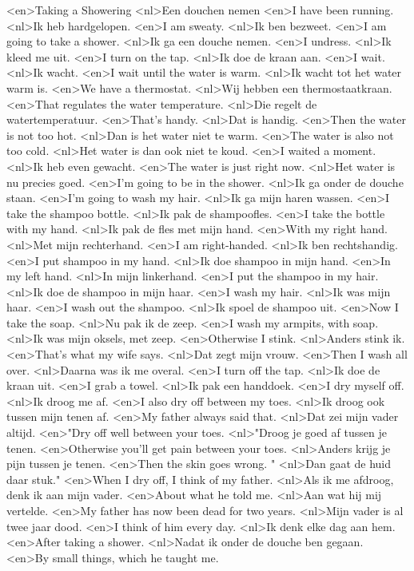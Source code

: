 <en>Taking a Showering
<nl>Een douchen nemen
<en>I have been running.
<nl>Ik heb hardgelopen.
<en>I am sweaty.
<nl>Ik ben bezweet.
<en>I am going to take a shower.
<nl>Ik ga een douche nemen.
<en>I undress.
<nl>Ik kleed me uit.
<en>I turn on the tap.
<nl>Ik doe de kraan aan.
<en>I wait.
<nl>Ik wacht.
<en>I wait until the water is warm.
<nl>Ik wacht tot het water warm is.
<en>We have a thermostat.
<nl>Wij hebben een thermostaatkraan.
<en>That regulates the water temperature.
<nl>Die regelt de watertemperatuur.
<en>That's handy.
<nl>Dat is handig.
<en>Then the water is not too hot.
<nl>Dan is het water niet te warm.
<en>The water is also not too cold.
<nl>Het water is dan ook niet te koud.
<en>I waited a moment.
<nl>Ik heb even gewacht.
<en>The water is just right now.
<nl>Het water is nu precies goed.
<en>I'm going to be in the shower.
<nl>Ik ga onder de douche staan.
<en>I'm going to wash my hair.
<nl>Ik ga mijn haren wassen.
<en>I take the shampoo bottle.
<nl>Ik pak de shampoofles.
<en>I take the bottle with my hand.
<nl>Ik pak de fles met mijn hand.
<en>With my right hand.
<nl>Met mijn rechterhand.
<en>I am right-handed.
<nl>Ik ben rechtshandig.
<en>I put shampoo in my hand.
<nl>Ik doe shampoo in mijn hand.
<en>In my left hand.
<nl>In mijn linkerhand.
<en>I put the shampoo in my hair.
<nl>Ik doe de shampoo in mijn haar.
<en>I wash my hair.
<nl>Ik was mijn haar.
<en>I wash out the shampoo.
<nl>Ik spoel de shampoo uit.
<en>Now I take the soap.
<nl>Nu pak ik de zeep.
<en>I wash my armpits, with soap.
<nl>Ik was mijn oksels, met zeep.
<en>Otherwise I stink.
<nl>Anders stink ik.
<en>That's what my wife says.
<nl>Dat zegt mijn vrouw.
<en>Then I wash all over.
<nl>Daarna was ik me overal.
<en>I turn off the tap.
<nl>Ik doe de kraan uit.
<en>I grab a towel.
<nl>Ik pak een handdoek.
<en>I dry myself off.
<nl>Ik droog me af.
<en>I also dry off between my toes.
<nl>Ik droog ook tussen mijn tenen af.
<en>My father always said that.
<nl>Dat zei mijn vader altijd.
<en>"Dry off well between your toes.
<nl>"Droog je goed af tussen je tenen.
<en>Otherwise you'll get pain between your toes.
<nl>Anders krijg je pijn tussen je tenen.
<en>Then the skin goes wrong. "
<nl>Dan gaat de huid daar stuk."
<en>When I dry off, I think of my father.
<nl>Als ik me afdroog, denk ik  aan mijn vader.
<en>About what he told me.
<nl>Aan wat hij mij vertelde.
<en>My father has now been dead for two years.
<nl>Mijn vader is al twee jaar dood.
<en>I think of him every day.
<nl>Ik denk elke dag aan hem.
<en>After taking a shower.
<nl>Nadat  ik onder de douche ben gegaan.
<en>By small things, which he taught me.
